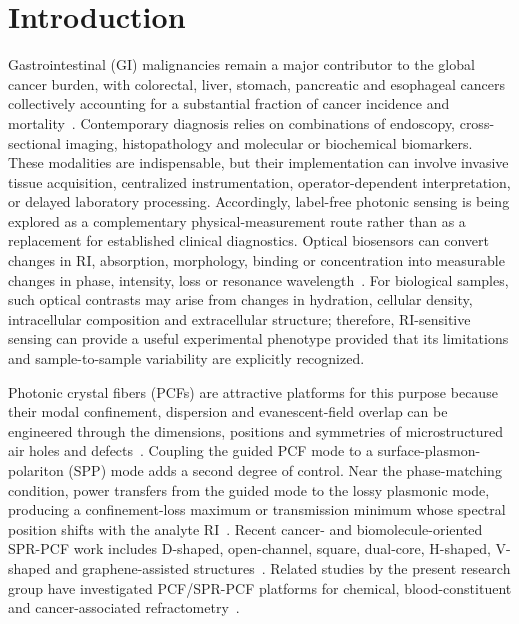 \documentclass[5p,times,twocolumn]{elsarticle}
\begin{document}
\section{Introduction}
\label{section_1}

Gastrointestinal (GI) malignancies remain a major contributor to the global cancer burden, with colorectal, liver, stomach, pancreatic and esophageal cancers collectively accounting for a substantial fraction of cancer incidence and mortality~\cite{Sung2026Global,Bray2024Global}. Contemporary diagnosis relies on combinations of endoscopy, cross-sectional imaging, histopathology and molecular or biochemical biomarkers. These modalities are indispensable, but their implementation can involve invasive tissue acquisition, centralized instrumentation, operator-dependent interpretation, or delayed laboratory processing. Accordingly, label-free photonic sensing is being explored as a complementary physical-measurement route rather than as a replacement for established clinical diagnostics. Optical biosensors can convert changes in RI, absorption, morphology, binding or concentration into measurable changes in phase, intensity, loss or resonance wavelength~\cite{Zhang2021EIS,DeLuna2018PC,DeLuna2019RI,Singh2025Review}. For biological samples, such optical contrasts may arise from changes in hydration, cellular density, intracellular composition and extracellular structure; therefore, RI-sensitive sensing can provide a useful experimental phenotype provided that its limitations and sample-to-sample variability are explicitly recognized.

Photonic crystal fibers (PCFs) are attractive platforms for this purpose because their modal confinement, dispersion and evanescent-field overlap can be engineered through the dimensions, positions and symmetries of microstructured air holes and defects~\cite{Knight2003,Russell2003,Russell2006,Pissadakis2015,Akowuah2012JQE}. Coupling the guided PCF mode to a surface-plasmon-polariton (SPP) mode adds a second degree of control. Near the phase-matching condition, power transfers from the guided mode to the lossy plasmonic mode, producing a confinement-loss maximum or transmission minimum whose spectral position shifts with the analyte RI~\cite{Ritchie1957,Otto1968,Kretschmann1968,Homola2008,Chen2012SPR,Piliarik2009Limits}. Recent cancer- and biomolecule-oriented SPR-PCF work includes D-shaped, open-channel, square, dual-core, H-shaped, V-shaped and graphene-assisted structures~\cite{Yasli2021Cancer,Chaudhary2022TNB,Ehyaee2023EPJ,Mittal2023Photonics,Ibrahimi2023Plasmonics,Sardar2024JSEN,Abdelghaffar2024JOSAB,Pappu2024Plasmonics,Arafin2024OME,Khan2025Prostate}. Related studies by the present research group have investigated PCF/SPR-PCF platforms for chemical, blood-constituent and cancer-associated refractometry~\cite{Khan2021Covid,Khan2023Cancer,Khan2023Petrochemical,Islam2022AZO,Islam2022Cyanide,Islam2023DualArrow,Khan2024GoldNanowire,Khan2025Prostate}.
\end{document}
